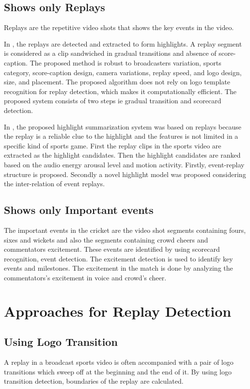 \subsection{Shows only Replays}
Replays are the repetitive video shots that shows the key events in the video.

In \cite{7479531}, the replays are detected and extracted to form highlights. A replay segment is considered as a clip sandwiched in gradual transitions and absence of score-caption. The proposed method is robust to broadcasters variation, sports category, score-caption design, camera variations, replay speed, and logo design, size, and placement. The proposed algorithm does not rely on logo template recognition for replay detection, which makes it computationally efficient. The proposed system consists of two steps ie gradual transition and scorecard detection.

In \cite{4036924}, the proposed highlight summarization system was based on replays because the replay is a reliable clue to the highlight and the features is not limited in a specific kind of sports game. First the replay clips in the sports video are extracted as the highlight candidates. Then the highlight candidates are ranked based on the audio energy arousal level and motion activity.  Firstly, event-replay structure is proposed. Secondly a novel highlight model was proposed considering the inter-relation of event replays.
\subsection{Shows only Important events}
The important events in the cricket are the video shot segments containing fours, sixes and wickets and also the segments containing crowd cheers and commentators excitement. These events are identified by using scorecard recognition\cite{7479531,4756096}, event detection. The excitement detection\cite{8491305,7101847} is used to identify key events and milestones. The excitement in the match is done by analyzing the commentators's excitement in voice and crowd's cheer.
\section{Approaches for Replay Detection}

\subsection{Using Logo Transition}
A replay in a broadcast sports video is often accompanied with a pair of logo transitions which sweep off at the beginning and the end of it. By using logo transition detection, boundaries of the replay are calculated.

